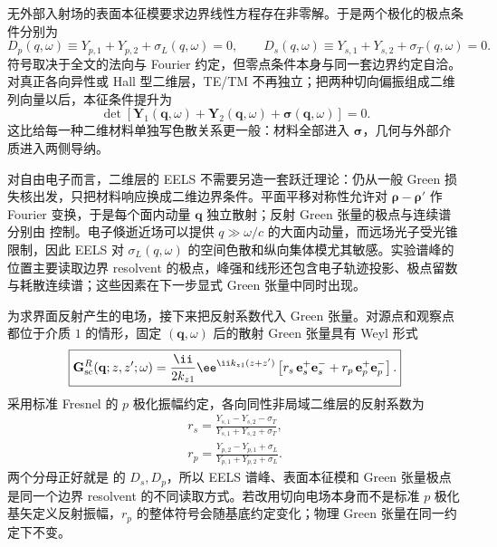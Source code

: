 无外部入射场的表面本征模要求边界线性方程存在非零解。于是两个极化的极点条件分别为
\begin{equation}
\boxed{
D_p(q,\omega)
\equiv
Y_{p,1}+Y_{p,2}+\sigma_L(q,\omega)=0,
\qquad
D_s(q,\omega)
\equiv
Y_{s,1}+Y_{s,2}+\sigma_T(q,\omega)=0.}
\label{eq:2d_sheet_surface_mode_conditions}
\end{equation}
符号取决于全文的法向与 Fourier 约定，但零点条件本身与同一套边界约定自洽。对真正各向异性或 Hall 型二维层，TE/TM 不再独立；把两种切向偏振组成二维列向量以后，本征条件提升为
\begin{equation}
\boxed{
\det\!\left[
\mathbf Y_1(\mathbf q,\omega)
+\mathbf Y_2(\mathbf q,\omega)
+\boldsymbol\sigma(\mathbf q,\omega)
\right]=0.}
\label{eq:2d_sheet_anisotropic_pole_determinant}
\end{equation}
这比给每一种二维材料单独写色散关系更一般：材料全部进入 $\boldsymbol\sigma$，几何与外部介质进入两侧导纳。

对自由电子而言，二维层的 EELS 不需要另造一套跃迁理论：仍从一般 Green 损失核出发，只把材料响应换成二维边界条件。平面平移对称性允许对 $\boldsymbol\rho-\boldsymbol\rho'$ 作 Fourier 变换，于是每个面内动量 $\mathbf q$ 独立散射；反射 Green 张量的极点与连续谱分别由 控制。电子倏逝近场可以提供 $q\gg\omega/c$ 的大面内动量，而远场光子受光锥限制，因此 EELS 对 $\sigma_L(q,\omega)$ 的空间色散和纵向集体模尤其敏感\cite{Simonaitis2025EELS2D}。实验谱峰的位置主要读取边界 resolvent 的极点，峰强和线形还包含电子轨迹投影、极点留数与耗散连续谱；这些因素在下一步显式 Green 张量中同时出现。

为求界面反射产生的电场，接下来把反射系数代入 Green 张量。对源点和观察点都位于介质 $1$ 的情形，固定 $(\mathbf q,\omega)$ 后的散射 Green 张量具有 Weyl 形式
\begin{equation}
\boxed{
\mathbf G_{\rm sc}^R(\mathbf q;z,z';\omega)
=\frac{\ii}{2k_{z1}}\ee^{\ii k_{z1}(z+z')}
\left[r_s\,\mathbf e_s^+\mathbf e_s^-+r_p\,\mathbf e_p^+\mathbf e_p^-\right].}
\label{eq:2d_sheet_reflected_green_weyl}
\end{equation}
采用标准 Fresnel 的 $p$ 极化振幅约定，各向同性非局域二维层的反射系数为
\begin{align}
\boxed{r_s
=\frac{Y_{s,1}-Y_{s,2}-\sigma_T}
{Y_{s,1}+Y_{s,2}+\sigma_T},}
\label{eq:2d_sheet_rs_conductivity}\\
\boxed{r_p
=\frac{Y_{p,2}-Y_{p,1}+\sigma_L}
{Y_{p,1}+Y_{p,2}+\sigma_L}.}
\label{eq:2d_sheet_rp_conductivity}
\end{align}
两个分母正好就是 的 $D_s,D_p$，所以 EELS 谱峰、表面本征模和 Green 张量极点是同一个边界 resolvent 的不同读取方式。若改用切向电场本身而不是标准 $p$ 极化基矢定义反射振幅，$r_p$ 的整体符号会随基底约定变化；物理 Green 张量在同一约定下不变。

